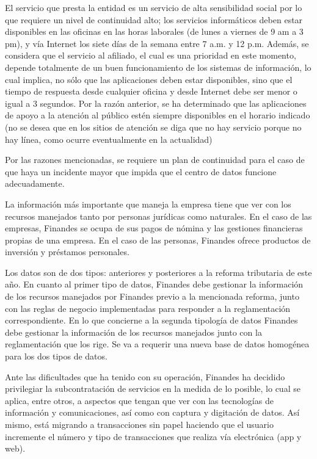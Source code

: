\documentclass[a4paper]{article}
\begin{document}
El servicio que presta la entidad es un servicio de alta sensibilidad social por lo que requiere un nivel de continuidad
alto; los servicios informáticos deben estar disponibles en las oficinas en las horas laborales (de lunes a viernes de
9 am a 3 pm), y vía Internet los siete días de la semana entre 7 a.m. y 12 p.m. Además, se considera que el servicio
al afiliado, el cual es una prioridad en este momento, depende totalmente de un buen funcionamiento de los
sistemas de información, lo cual implica, no sólo que las aplicaciones deben estar disponibles, sino que el tiempo
de respuesta desde cualquier oficina y desde Internet debe ser menor o igual a 3 segundos. Por la razón anterior,
se ha determinado que las aplicaciones de apoyo a la atención al público estén siempre disponibles en el horario
indicado (no se desea que en los sitios de atención se diga que no hay servicio porque no hay línea, como ocurre
eventualmente en la actualidad)

Por las razones mencionadas, se requiere un plan de continuidad para el caso de que haya un incidente mayor que
impida que el centro de datos funcione adecuadamente.

La información más importante que maneja la empresa tiene que ver con los recursos manejados tanto por
personas jurídicas como naturales. En el caso de las empresas, Finandes se ocupa de sus pagos de nómina y las
gestiones financieras propias de una empresa. En el caso de las personas, Finandes ofrece productos de inversión y
préstamos personales.

Los datos son de dos tipos: anteriores y posteriores a la reforma tributaria de este año. En cuanto al primer tipo de
datos, Finandes debe gestionar la información de los recursos manejados por Finandes previo a la mencionada
reforma, junto con las reglas de negocio implementadas para responder a la reglamentación correspondiente. En
lo que concierne a la segunda tipología de datos Finandes debe gestionar la información de los recursos manejados
junto con la reglamentación que los rige. Se va a requerir una nueva base de datos homogénea para los dos tipos
de datos.

Ante las dificultades que ha tenido con su operación, Finandes ha decidido privilegiar la subcontratación de servicios
en la medida de lo posible, lo cual se aplica, entre otros, a aspectos que tengan que ver con las tecnologías de
información y comunicaciones, así como con captura y digitación de datos. Así mismo, está migrando a
transacciones sin papel haciendo que el usuario incremente el número y tipo de transacciones que realiza vía
electrónica (app y web).
\end{document}
